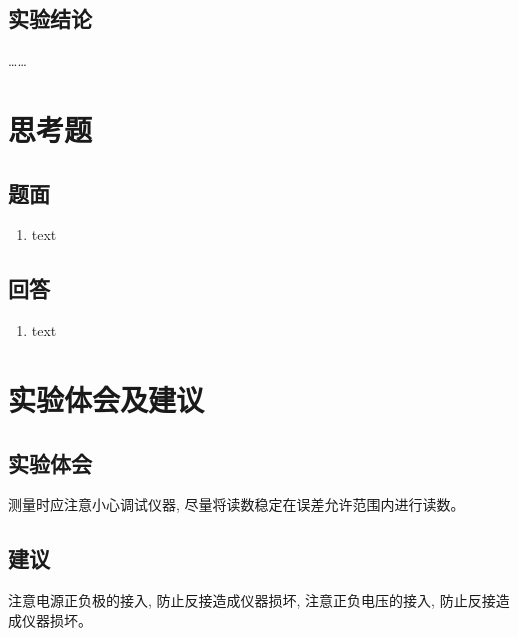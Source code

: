 \documentclass[12pt, a4paper]{article} %
\begin{document}
\subsection{实验结论}
……
\section{思考题}
\subsection{题面}
\begin{enumerate}[leftmargin=50pt,label=(\arabic*)] %
    \item text

\end{enumerate}
\subsection{回答}

\begin{enumerate}[leftmargin=50pt,label=(\arabic*)] %
    \item text
\end{enumerate}

\section{实验体会及建议}
\subsection{实验体会}
测量时应注意小心调试仪器, 尽量将读数稳定在误差允许范围内进行读数。
\subsection{建议}
注意电源正负极的接入, 防止反接造成仪器损坏, 注意正负电压的接入, 防止反接造成仪器损坏。
\end{document}
